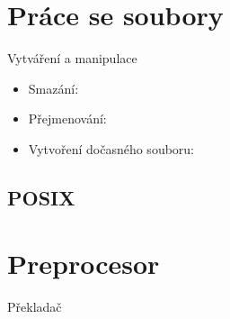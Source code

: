 \section{Práce se soubory}
\frame{\sectionpage}



\begin{frame}{Vytváření a manipulace}

  \begin{itemize}
    \item Smazání: 

    \pause

    \item Přejmenování: 

    \pause

    \item Vytvoření dočasného souboru: 
  \end{itemize}

\end{frame}


\subsection*{POSIX}
\frame{\subsectionpage}




\section{Preprocesor}
\frame{\sectionpage}

\begin{frame}[fragile]{Překladač}

  \begin{center}
    
  \end{center}

\end{frame}

